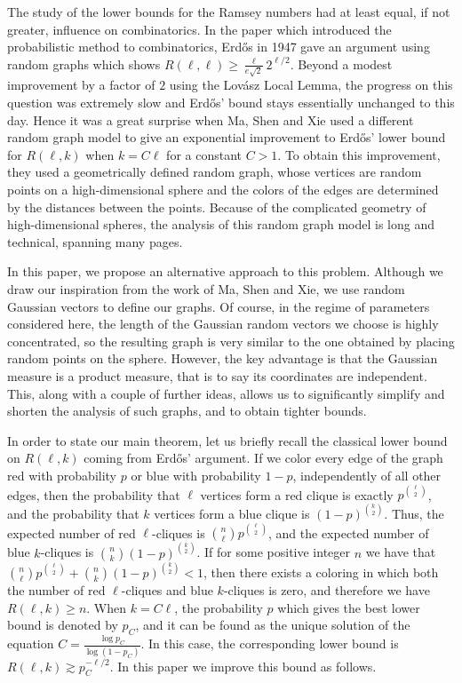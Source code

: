 \documentclass[11pt]{amsart}
\theoremstyle{definition}
\begin{document}
The study of the lower bounds for the Ramsey numbers had at least equal, if not greater, influence on combinatorics. In the paper which introduced the probabilistic method to combinatorics, Erd\H{o}s \cite{Erd47} in 1947 gave an argument using random graphs which shows $R(\ell, \ell)\geq \frac{\ell}{e\sqrt{2}} 2^{\ell/2}$. Beyond a modest improvement \cite{Spe75} by a factor of $2$ using the Lov\'asz Local Lemma, the progress on this question was extremely slow and Erd\H{o}s' bound stays essentially unchanged to this day. Hence it was a great surprise when Ma, Shen and Xie \cite{MSX25} used a different random graph model to give an exponential improvement to Erd\H{o}s' lower bound for $R(\ell, k)$ when $k=C\ell$ for a constant $C>1$. To obtain this improvement, they used a geometrically defined random graph, whose vertices are random points on a high-dimensional sphere and the colors of the edges are determined by the distances between the points. Because of the complicated geometry of high-dimensional spheres, the analysis of this random graph model is long and technical, spanning many pages.

In this paper, we propose an alternative approach to this problem. Although we draw our inspiration from the work of Ma, Shen and Xie, we use random Gaussian vectors to define our graphs. Of course, in the regime of parameters considered here, the length of the Gaussian random vectors we choose is highly concentrated, so the resulting graph is very similar to the one obtained by placing random points on the sphere. However, the key advantage is that the Gaussian measure is a product measure, that is to say its coordinates are independent. This, along with a couple of further ideas, allows us to significantly simplify and shorten the analysis of such graphs, and to obtain tighter bounds.

In order to state our main theorem, let us briefly recall the classical lower bound on $R(\ell, k)$ coming from Erd\H{o}s' argument. If we color every edge of the graph red with probability $p$ or blue with probability $1-p$, independently of all other edges, then the probability that $\ell$ vertices form a red clique is exactly $p^{\binom{\ell}{2}}$, and the probability that $k$ vertices form a blue clique is $(1-p)^{\binom{k}{2}}$. Thus, the expected number of red $\ell$-cliques is $\binom{n}{\ell}p^{\binom{\ell}{2}}$, and the expected number of blue $k$-cliques is $\binom{n}{k}(1-p)^{\binom{k}{2}}$. If for some positive integer $n$ we have that $\binom{n}{\ell}p^{\binom{\ell}{2}}+\binom{n}{k}(1-p)^{\binom{k}{2}}<1$, then there exists a coloring in which both the number of red $\ell$-cliques and blue $k$-cliques is zero, and therefore we have $R(\ell, k)\geq n$. When $k=C\ell$, the probability $p$ which gives the best lower bound is denoted by $p_C$, and it can be found as the unique solution of the equation $C=\frac{\log p_C}{\log(1-p_C)}$. In this case, the corresponding lower bound is $R(\ell, k)\gtrsim p_C^{-\ell/2}$. In this paper we improve this bound as follows.
\end{document}
